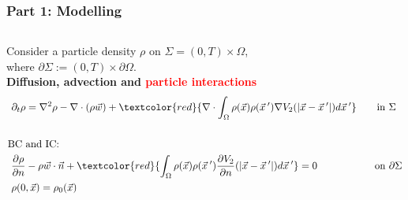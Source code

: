 \documentclass[aspectratio=169,xcolor=dvipsnames]{beamer}
\begin{document}
\begin{frame}
	\frametitle{Part 1: Modelling}
	\begin{columns}
		Consider a particle density $\rho$ 
		on $\Sigma =  (0,T) \times \Omega$, \\ where $\partial \Sigma := (0,T) \times \partial \Omega $.
		\vspace{0.8cm}
		\textbf{\\ Diffusion, advection and \textcolor{red}{particle interactions}}
		\begin{align*}
		\partial_t \rho &= \nabla^2 \rho - \nabla \cdot (\rho \vec{w}) +\textcolor{red}{ \nabla \cdot \int_\Omega \rho(\vec{x}) \rho(\vec{x}\hspace{0.2em}') \nabla V_2(|\vec{x}-\vec{x}\hspace{0.2em}'|)d\vec{x}\hspace{0.2em}'} \qquad\text{in    } \Sigma\\
		\\
		\text{BC }& \text{and IC:}\\
		\frac{\partial \rho}{\partial n}& - \rho \vec{w} \cdot \vec{n} +\textcolor{red}{ \int_\Omega \rho(\vec{x}) \rho(\vec{x}\hspace{0.2em}')  \frac{ \partial  V_2}{\partial n}(|\vec{x}-\vec{x}\hspace{0.2em}'|)d\vec{x}\hspace{0.2em}'} = 0 \quad\ \ \qquad \qquad\text{on   } \partial \Sigma   \\
		\rho(0&,\vec{x}) = \rho_0(\vec{x}) 
		\end{align*}
		\vspace{-1cm}
		\begin{figure}
			\includegraphics[width=3cm]{bloodcells.jpg}\\
			\includegraphics[width=3cm]{bacteria.png}\\
			\includegraphics[width=3cm]{Microfilter.png}\\
			\includegraphics[width=3cm]{beer.png}
		\end{figure}
	\end{columns}
\end{frame}
\end{document}
